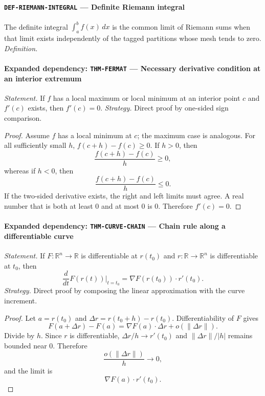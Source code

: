 \documentclass[10pt]{article}
\newcommand{\pidraw}[1]{\begingroup\urlstyle{tt}\nolinkurl{#1}\endgroup}
\theoremstyle{definition}
\theoremstyle{remark}
\begin{document}
\paragraph{\pidraw{DEF-RIEMANN-INTEGRAL} --- Definite Riemann integral}
The definite integral $\int_a^b f(x)\,dx$ is the common limit of Riemann sums when that limit exists independently of the tagged partitions whose mesh tends to zero.
\textit{Definition.}

\paragraph{Expanded dependency: \pidraw{THM-FERMAT} --- Necessary derivative condition at an interior extremum}
\textit{Statement.} If $f$ has a local maximum or local minimum at an interior point $c$ and $f'(c)$ exists, then $f'(c)=0$.
\textit{Strategy.} Direct proof by one-sided sign comparison.
\begin{proof}Assume $f$ has a local minimum at $c$; the maximum case is analogous.
For all sufficiently small $h$,
$f(c+h)-f(c)\ge0$. If $h>0$, then
\[
\frac{f(c+h)-f(c)}{h}\ge0,
\]
whereas if $h<0$, then
\[
\frac{f(c+h)-f(c)}{h}\le0.
\]
If the two-sided derivative exists, the right and left limits must agree.
A real number that is both at least $0$ and at most $0$ is $0$.
Therefore $f'(c)=0$.\end{proof}

\paragraph{Expanded dependency: \pidraw{THM-CURVE-CHAIN} --- Chain rule along a differentiable curve}
\textit{Statement.} If $F:\mathbb{R}^n\to\mathbb{R}$ is differentiable at $r(t_0)$ and
$r:\mathbb{R}\to\mathbb{R}^n$ is differentiable at $t_0$, then
\[
\frac{d}{dt}F(r(t))\Big|_{t=t_0}
=
\nabla F(r(t_0))\cdot r'(t_0).
\]
\textit{Strategy.} Direct proof by composing the linear approximation with the curve increment.
\begin{proof}Let $a=r(t_0)$ and $\Delta r=r(t_0+h)-r(t_0)$. Differentiability of $F$ gives
\[
F(a+\Delta r)-F(a)=\nabla F(a)\cdot\Delta r+o(\|\Delta r\|).
\]
Divide by $h$. Since $r$ is differentiable,
$\Delta r/h\to r'(t_0)$ and $\|\Delta r\|/|h|$ remains bounded near $0$.
Therefore
\[
\frac{o(\|\Delta r\|)}{h}\to0,
\]
and the limit is
\[
\nabla F(a)\cdot r'(t_0).
\]\end{proof}
\end{document}
